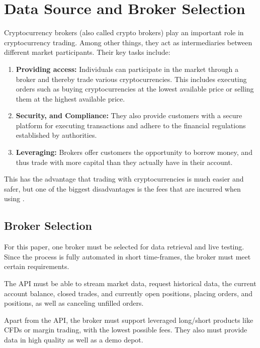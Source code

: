 \section{Data Source and Broker Selection}

Cryptocurrency brokers (also called crypto brokers) play an important role in cryptocurrency trading.
Among other things, they act as intermediaries between different market participants.
Their key tasks include:

\begin{enumerate}
    \item \textbf{Providing access:} Individuals can participate in the market through a broker and thereby trade various cryptocurrencies.
    This includes executing orders such as buying cryptocurrencies at the lowest available price or selling them at the highest available price.
    \item \textbf{Security, and Compliance:} They also provide customers with a secure platform for executing transactions and adhere to the financial regulations established by authorities.
    \item \textbf{Leveraging:} Brokers offer customers the opportunity to borrow money, and thus trade with more capital than they actually have in their account.
\end{enumerate}


\noindent
This has the advantage that trading with cryptocurrencies is much easier and safer, but one of the biggest disadvantages is the fees that are incurred when using \cite{broker-investing}.

\subsection{Broker Selection}
\label{chap:broker-selection}

For this paper, one broker must be selected for data retrieval and live testing.
Since the process is fully automated in short time-frames, the broker must meet certain requirements.

The API must be able to stream market data, request historical data, the current account balance, closed trades, and currently open positions, placing orders, and positions, as well as canceling unfilled orders.

Apart from the API, the broker must support leveraged long/short products like CFDs or margin trading, with the lowest possible fees.
They also must provide data in high quality as well as a demo depot.

